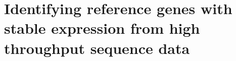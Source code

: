 
\chapter{Identifying reference genes with stable expression from high throughput sequence data}
\raggedbottom

